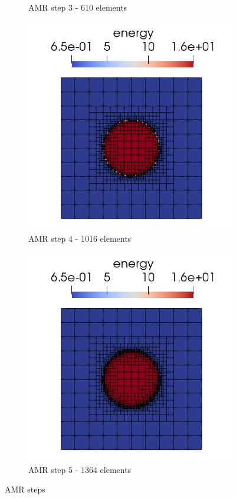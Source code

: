 \begin{figure}[H]
\begin{subfigure}[H]{40mm}
					\caption{AMR step 3 - 610 elements}
	\end{subfigure}
	\hspace{7mm}
	\begin{subfigure}[H]{40mm}
					\includegraphics[width=\textwidth]{img/adapt/sln4.jpg}
					\caption{AMR step 4 - 1016 elements}
	\end{subfigure}
	\hspace{7mm}
	\begin{subfigure}[H]{40mm}
					\includegraphics[width=\textwidth]{img/adapt/sln5.jpg}
					\caption{AMR step 5 - 1364 elements}
	\end{subfigure}
		\vspace{3mm}
	\caption{AMR steps}
	\label{figure:amrsimple}
\end{figure}

